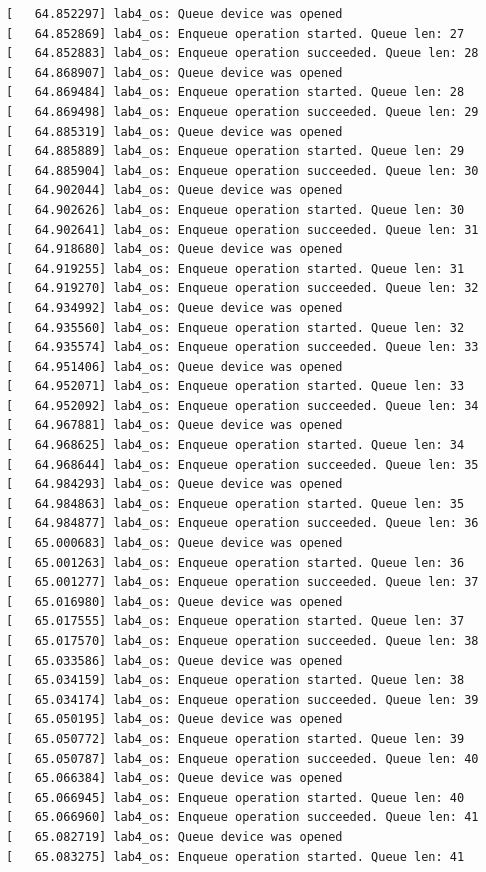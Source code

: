 \documentclass[a4paper,14pt]{extarticle}
\begin{document}
\begin{verbatim}
[   64.852297] lab4_os: Queue device was opened
[   64.852869] lab4_os: Enqueue operation started. Queue len: 27
[   64.852883] lab4_os: Enqueue operation succeeded. Queue len: 28
[   64.868907] lab4_os: Queue device was opened
[   64.869484] lab4_os: Enqueue operation started. Queue len: 28
[   64.869498] lab4_os: Enqueue operation succeeded. Queue len: 29
[   64.885319] lab4_os: Queue device was opened
[   64.885889] lab4_os: Enqueue operation started. Queue len: 29
[   64.885904] lab4_os: Enqueue operation succeeded. Queue len: 30
[   64.902044] lab4_os: Queue device was opened
[   64.902626] lab4_os: Enqueue operation started. Queue len: 30
[   64.902641] lab4_os: Enqueue operation succeeded. Queue len: 31
[   64.918680] lab4_os: Queue device was opened
[   64.919255] lab4_os: Enqueue operation started. Queue len: 31
[   64.919270] lab4_os: Enqueue operation succeeded. Queue len: 32
[   64.934992] lab4_os: Queue device was opened
[   64.935560] lab4_os: Enqueue operation started. Queue len: 32
[   64.935574] lab4_os: Enqueue operation succeeded. Queue len: 33
[   64.951406] lab4_os: Queue device was opened
[   64.952071] lab4_os: Enqueue operation started. Queue len: 33
[   64.952092] lab4_os: Enqueue operation succeeded. Queue len: 34
[   64.967881] lab4_os: Queue device was opened
[   64.968625] lab4_os: Enqueue operation started. Queue len: 34
[   64.968644] lab4_os: Enqueue operation succeeded. Queue len: 35
[   64.984293] lab4_os: Queue device was opened
[   64.984863] lab4_os: Enqueue operation started. Queue len: 35
[   64.984877] lab4_os: Enqueue operation succeeded. Queue len: 36
[   65.000683] lab4_os: Queue device was opened
[   65.001263] lab4_os: Enqueue operation started. Queue len: 36
[   65.001277] lab4_os: Enqueue operation succeeded. Queue len: 37
[   65.016980] lab4_os: Queue device was opened
[   65.017555] lab4_os: Enqueue operation started. Queue len: 37
[   65.017570] lab4_os: Enqueue operation succeeded. Queue len: 38
[   65.033586] lab4_os: Queue device was opened
[   65.034159] lab4_os: Enqueue operation started. Queue len: 38
[   65.034174] lab4_os: Enqueue operation succeeded. Queue len: 39
[   65.050195] lab4_os: Queue device was opened
[   65.050772] lab4_os: Enqueue operation started. Queue len: 39
[   65.050787] lab4_os: Enqueue operation succeeded. Queue len: 40
[   65.066384] lab4_os: Queue device was opened
[   65.066945] lab4_os: Enqueue operation started. Queue len: 40
[   65.066960] lab4_os: Enqueue operation succeeded. Queue len: 41
[   65.082719] lab4_os: Queue device was opened
[   65.083275] lab4_os: Enqueue operation started. Queue len: 41

\end{verbatim}
\end{document}
